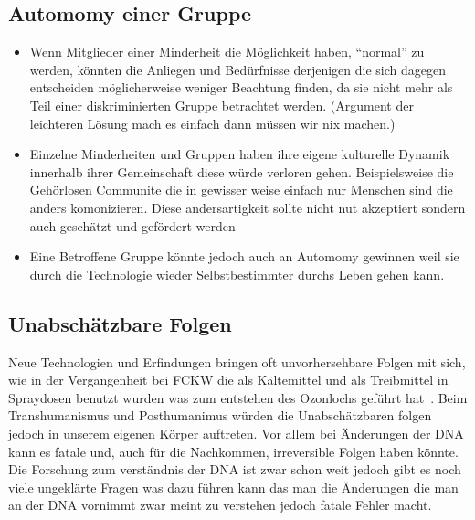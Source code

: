 \documentclass[a4paper,
DIV=13,
12pt,
BCOR=10mm,
department=FakEI,
twoside,
parskip=half,
automark,
]{OTHRartcl}
\begin{document}
\subsection*{Automomy einer Gruppe}
\begin{itemize}
    \item Wenn Mitglieder einer Minderheit die Möglichkeit haben, ``normal'' zu werden, könnten die Anliegen und Bedürfnisse derjenigen die sich dagegen entscheiden möglicherweise 
    weniger Beachtung finden, da sie nicht mehr als Teil einer diskriminierten Gruppe betrachtet werden. (Argument der leichteren Lösung mach es einfach dann müssen wir nix machen.)
    \item Einzelne Minderheiten und Gruppen haben ihre  eigene kulturelle Dynamik innerhalb ihrer Gemeinschaft diese würde verloren gehen. Beispielsweise die Gehörlosen Communite 
    die in gewisser weise einfach nur Menschen sind die anders komonizieren. Diese andersartigkeit sollte nicht nut akzeptiert sondern auch geschätzt und gefördert werden~\cite{lee2016cochlear}
    \item Eine Betroffene Gruppe könnte jedoch auch an Automomy gewinnen weil sie durch die Technologie wieder Selbstbestimmter durchs Leben gehen kann.~\cite{das2022locked}
\end{itemize}

\subsection*{Unabschätzbare Folgen}
Neue Technologien und Erfindungen bringen oft unvorhersehbare Folgen mit sich, wie in der Vergangenheit bei FCKW die als Kältemittel und als Treibmittel in Spraydosen benutzt wurden 
was zum entstehen des Ozonlochs  geführt hat~\cite{rowland1996stratospheric}. 
Beim Transhumanismus und Posthumanimus würden die Unabschätzbaren folgen jedoch in unserem eigenen Körper auftreten. Vor allem bei Änderungen der DNA kann es fatale und, auch für die 
Nachkommen, irreversible Folgen haben könnte. Die Forschung zum verständnis der DNA ist zwar schon weit jedoch gibt es noch viele ungeklärte Fragen was dazu führen kann das man die 
Änderungen die man an der DNA vornimmt zwar meint zu verstehen jedoch fatale Fehler macht.
\end{document}
